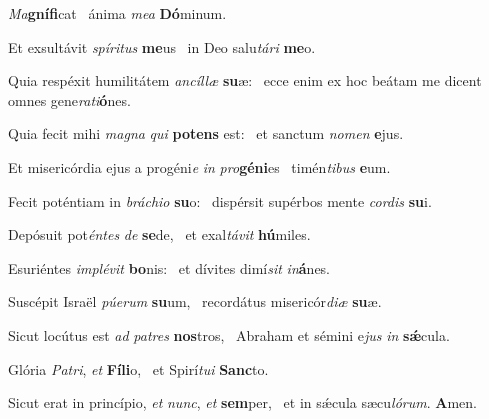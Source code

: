 \item \textit{Ma}\textbf{gní}\textbf{fi}cat~\psstar{} ánima \textit{me}\textit{a} \textbf{Dó}minum.

\item Et exsultávit \textit{spí}\textit{ri}\textit{tus} \textbf{me}us~\psstar{} in Deo salu\textit{tá}\textit{ri} \textbf{me}o.

\item Quia respéxit humilitátem \textit{an}\textit{cíl}\textit{læ} \textbf{su}æ:~\psstar{} ecce enim ex hoc beátam me dicent omnes gene\textit{ra}\textit{ti}\textbf{ó}nes.

\item Quia fecit mihi \textit{ma}\textit{gna} \textit{qui} \textbf{pot}\textbf{ens} est:~\psstar{} et sanctum \textit{no}\textit{men} \textbf{e}jus.

\item Et misericórdia ejus a progéni\textit{e} \textit{in} \textit{pro}\textbf{gé}\textbf{ni}es~\psstar{} timén\textit{ti}\textit{bus} \textbf{e}um.

\item Fecit poténtiam in \textit{brá}\textit{chi}\textit{o} \textbf{su}o:~\psstar{} dispérsit supérbos mente \textit{cor}\textit{dis} \textbf{su}i.

\item Depósuit pot\textit{én}\textit{tes} \textit{de} \textbf{se}de,~\psstar{} et exal\textit{tá}\textit{vit} \textbf{hú}miles.

\item Esuriéntes \textit{im}\textit{plé}\textit{vit} \textbf{bo}nis:~\psstar{} et dívites dimí\textit{sit} \textit{in}\textbf{á}nes.

\item Suscépit Israël \textit{pú}\textit{e}\textit{rum} \textbf{su}um,~\psstar{} recordátus misericór\textit{di}\textit{æ} \textbf{su}æ.

\item Sicut locútus est \textit{ad} \textit{pa}\textit{tres} \textbf{nos}tros,~\psstar{} Abraham et sémini e\textit{jus} \textit{in} \textbf{sǽ}cula.

\item Glória \textit{Pa}\textit{tri}, \textit{et} \textbf{Fí}\textbf{li}o,~\psstar{} et Spirí\textit{tu}\textit{i} \textbf{Sanc}to.

\item Sicut erat in princípio, \textit{et} \textit{nunc}, \textit{et} \textbf{sem}per,~\psstar{} et in sǽcula sæcu\textit{ló}\textit{rum}. \textbf{A}men.
